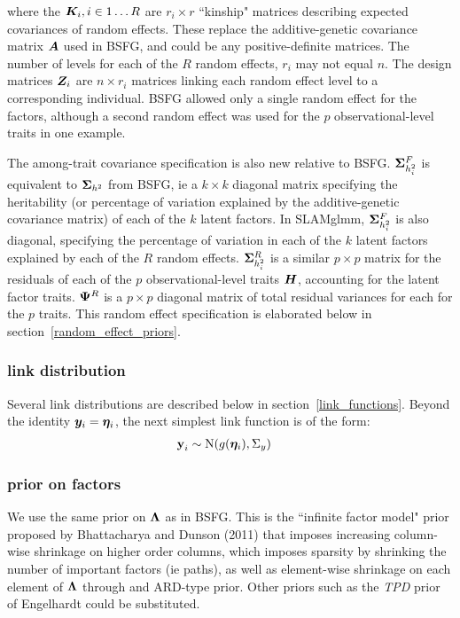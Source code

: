 \documentclass[11pt]{amsart}
\newcommand*{\B}[1]{\ifmmode\bm{#1}\else\textbf{#1}\fi}
\begin{document}
\noindent where the $\B{K}_i, i \in 1\dots R$ are $r_i \times r$ ``kinship" matrices describing expected covariances of random effects. These replace the additive-genetic covariance matrix $\B{A}$ used in BSFG, and could be any positive-definite matrices. The number of levels for each of the $R$ random effects, $r_i$ may not equal $n$. The design matrices $\B{Z}_i$ are $n \times r_i$ matrices linking each random effect level to a corresponding individual. BSFG allowed only a single random effect for the factors, although a second random effect was used for the $p$ observational-level traits in one example. 

The among-trait covariance specification is also new relative to BSFG. $\B{\Sigma}^F_{h^2_i}$ is equivalent to $\B{\Sigma}_{h^2}$ from BSFG, ie a $k \times k$ diagonal matrix specifying the heritability (or percentage of variation explained by the additive-genetic covariance matrix) of each of the $k$ latent factors. In SLAMglmm, $\B{\Sigma}^F_{h^2_i}$ is also diagonal, specifying the percentage of variation in each of the $k$ latent factors explained by each of the $R$ random effects. $\B{\Sigma}^R_{h^2_i}$ is a similar $p \times p$ matrix for the residuals of each of the $p$ observational-level traits $\B{H}$, accounting for the latent factor traits. $\B{\Psi}^R$ is a $p \times p$ diagonal matrix of total residual variances for each for the $p$ traits. This random effect specification is elaborated below in section~\ref{random_effect_priors}.

\subsubsection{link distribution}
Several link distributions are described below in section~\ref{link_functions}. 
Beyond the identity $\B{y}_i = \B{\eta}_i$, the next simplest link function is of the form:
\begin{align}
\B{y}_i &\sim \mbox{N}(g(\B{\eta}_i),\Sigma_y)
\end{align}

\subsubsection{prior on factors}
We use the same prior on $\B{\Lambda}$ as in BSFG. This is the ``infinite factor model" prior proposed by Bhattacharya and Dunson (2011) that imposes increasing column-wise shrinkage on higher order columns, which imposes sparsity by shrinking the number of important factors (ie paths), as well as element-wise shrinkage on each element of $\B{\Lambda}$ through and ARD-type prior. Other priors such as the \emph{TPD} prior of Engelhardt could be substituted.
\end{document}
